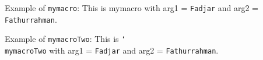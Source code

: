 \documentclass{article}
\newcommand{\mymacro}[2]{
This is mymacro with arg1 = \texttt{#1} and arg2 = \texttt{#2}.
}
\DeclareRobustCommand{\mymacroTwo}[2]{
This is \texttt{\char`\\mymacroTwo} with arg1 = \texttt{#1} and arg2 = \texttt{#2}.
}
\begin{document}
Example of \verb|mymacro|: \mymacro{Fadjar}{Fathurrahman}

Example of \verb|mymacroTwo|: \mymacroTwo{Fadjar}{Fathurrahman}
\end{document}
